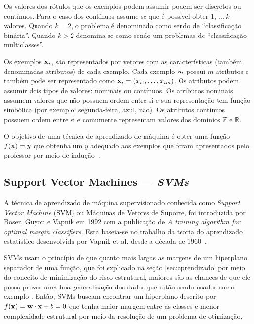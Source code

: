 Os valores dos rótulos que os exemplos podem assumir podem ser discretos ou contínuos. Para o caso dos contínuos assume-se que é possível obter $1,\dotsc,k$ valores. Quando $k = 2$, o problema é denominado como sendo de ``classificação binária''. Quando $k > 2$ denomina-se como sendo um problemas de ``classificação multiclasses''.

Os exemplos $\mathbf{x}_i$, são representados por vetores com as características (também denominadas atributos) de cada exemplo. Cada exemplo $\mathbf{x}_i$ possui $m$ atributos e também pode ser representado como $\mathbf{x}_i = (x_{i1},\dotsc,x_{im})$. Os atributos podem assumir dois tipos de valores: nominais ou contínuos. Os atributos nominais assumem valores que não possuem ordem entre si e sua representação tem função simbólica (por exemplo: segunda-feira, azul, não). Os atributos contínuos possuem ordem entre si e comumente representam valores dos domínios $\mathbb{Z}$ e $\mathbb{R}$.

O objetivo de uma técnica de aprendizado de máquina é obter uma função $f(\mathbf{x}) = y$ que obtenha um $y$ adequado aos exemplos que foram apresentados pelo professor por meio de indução~\cite{osuna1997support}.


\subsection{Support Vector Machines --- \it{SVMs}}\label{sec:svm}
%

A técnica de aprendizado de máquina supervisionado conhecida como \emph{Support Vector Machine} (SVM) ou Máquinas de Vetores de Suporte, foi introduzida por Boser, Guyon e Vapnik em 1992 com a publica\c{c}ão de \emph{A training algorithm for optimal margin classifiers}\nocite{boser1992training}. Esta baseia-se no trabalho da teoria do aprendizado estatístico desenvolvida por Vapnik et al. desde a década de 1960~\cite{antos2003data}.

SVMs usam o princípio de que quanto mais largas as margens de um hiperplano separador de uma fun\c{c}ão, que foi explicado na se\c{c}ão \ref{sec:aprendizado} por meio do conceito de minimiza\c{c}ão do risco estrutural, maiores são as chances de que ele possa prover uma boa generaliza\c{c}ão dos dados que estão sendo usados como exemplo \cite{chapelle2002choosing}. Então, SVMs buscam encontrar um hiperplano descrito por $f(\mathbf{x}) = \mathbf{w}\cdot\mathbf{x} + b = 0$ que tenha maior margem entre as classes e menor complexidade estrutural por meio da resolu\c{c}ão de um problema de otimiza\c{c}ão.

